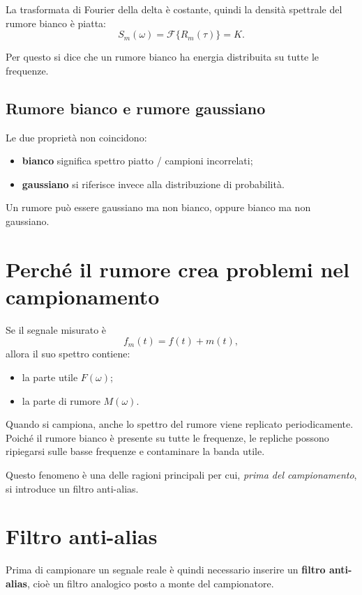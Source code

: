 La trasformata di Fourier della delta è costante, quindi la densità spettrale
del rumore bianco è piatta:
\[
S_m(\omega)=\mathcal{F}\{R_m(\tau)\}=K.
\]

Per questo si dice che un rumore bianco ha energia distribuita su tutte le frequenze.

\subsection{Rumore bianco e rumore gaussiano}

Le due proprietà non coincidono:
\begin{itemize}
    \item \textbf{bianco} significa spettro piatto / campioni incorrelati;
    \item \textbf{gaussiano} si riferisce invece alla distribuzione di probabilità.
\end{itemize}

Un rumore può essere gaussiano ma non bianco, oppure bianco ma non gaussiano.

\section{Perché il rumore crea problemi nel campionamento}

Se il segnale misurato è
\[
f_m(t)=f(t)+m(t),
\]
allora il suo spettro contiene:
\begin{itemize}
    \item la parte utile \(F(\omega)\);
    \item la parte di rumore \(M(\omega)\).
\end{itemize}

Quando si campiona, anche lo spettro del rumore viene replicato periodicamente.
Poiché il rumore bianco è presente su tutte le frequenze, le repliche possono ripiegarsi
sulle basse frequenze e contaminare la banda utile.

Questo fenomeno è una delle ragioni principali per cui, \emph{prima del campionamento},
si introduce un filtro anti-alias.

\section{Filtro anti-alias}

Prima di campionare un segnale reale è quindi necessario inserire un
\textbf{filtro anti-alias}, cioè un filtro analogico posto a monte del campionatore.

